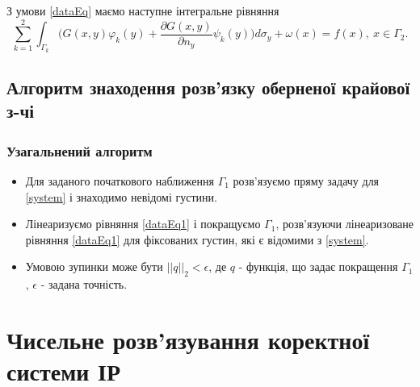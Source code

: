 \documentclass[10pt]{beamer}
\begin{document}
\begin{frame}

 З умови \eqref{dataEq} маємо наступне інтегральне рівняння
 \begin{equation}
 \label{dataEq1}
	\sum_{k=1}^{2}\int_{\Gamma_k}\bigg(G(x,y)\varphi_k(y)+\frac{\partial G(x,y)}{\partial n_y}\psi_k(y)\bigg)d\sigma_y+\omega(x)=f(x), \ x\in\Gamma_2.
 \end{equation}

\end{frame}

\subsection{Алгоритм знаходення розв'язку оберненої крайової з-чі}
\begin{frame}
\frametitle{Узагальнений алгоритм}

\begin{itemize}
  \item Для заданого початкового наближення $\Gamma_1$ розв'язуємо пряму задачу для \eqref{system} і знаходимо невідомі густини.
  \item Лінеаризуємо рівняння \eqref{dataEq1} і покращуємо $\Gamma_1$, розв'язуючи лінеаризоване рівняння \eqref{dataEq1} для фіксованих густин, які є відомими з \eqref{system}.
  \item Умовою зупинки може бути $||q||_2  <\epsilon$, де $q$ - функція, що задає покращення  $\Gamma_1$, $\epsilon$ - задана точність.
\end{itemize}

\end{frame}

\section{Чисельне розв'язування коректної системи ІР}
\end{document}

